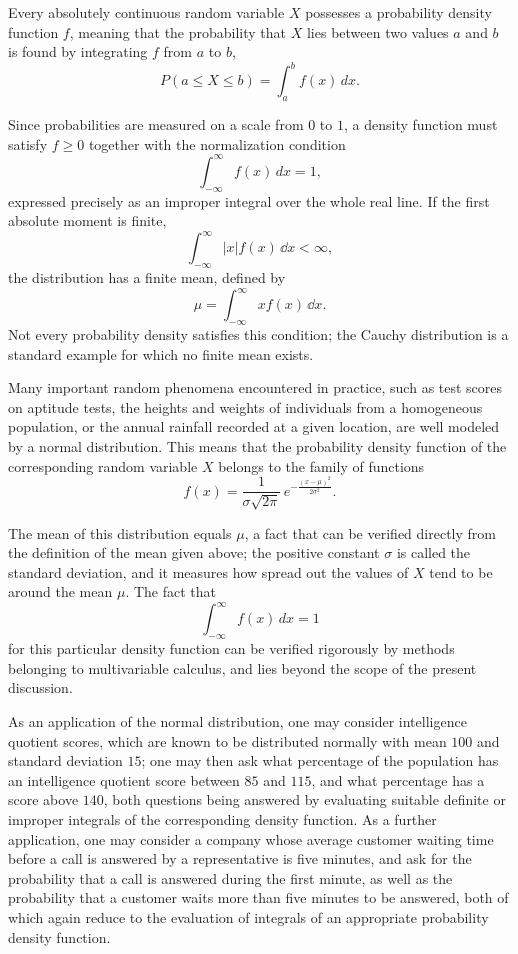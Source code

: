 Every absolutely continuous random variable $X$ possesses a probability density function $f$, meaning that the probability that $X$ lies between two values $a$ and $b$ is found by integrating $f$ from $a$ to $b$,
\[
P(a \leq X \leq b) = \int_a^b f(x) \, dx.
\]

Since probabilities are measured on a scale from $0$ to $1$, a density function must satisfy $f \geq 0$ together with the normalization condition
\[
\int_{-\infty}^{\infty} f(x) \, dx = 1,
\]
expressed precisely as an improper integral over the whole real line. If
the first absolute moment is finite,
\[
\int_{-\infty}^{\infty}|x|f(x)\,\dd x<\infty,
\]
the distribution has a finite mean, defined by
\[
\mu = \int_{-\infty}^{\infty} x f(x) \,\dd x.
\]
Not every probability density satisfies this condition; the Cauchy
distribution is a standard example for which no finite mean exists.


Many important random phenomena encountered in practice, such as test scores on aptitude tests, the heights and weights of individuals from a homogeneous population, or the annual rainfall recorded at a given location, are well modeled by a normal distribution. This means that the probability density function of the corresponding random variable $X$ belongs to the family of functions
\[
f(x) = \frac{1}{\sigma \sqrt{2\pi}} \, e^{-\frac{(x-\mu)^2}{2\sigma^2}}.
\]

The mean of this distribution equals $\mu$, a fact that can be verified directly from the definition of the mean given above; the positive constant $\sigma$ is called the standard deviation, and it measures how spread out the values of $X$ tend to be around the mean $\mu$. The fact that
\[
\int_{-\infty}^{\infty} f(x) \, dx = 1
\]
for this particular density function can be verified rigorously by methods belonging to multivariable calculus, and lies beyond the scope of the present discussion.

As an application of the normal distribution, one may consider intelligence quotient scores, which are known to be distributed normally with mean $100$ and standard deviation $15$; one may then ask what percentage of the population has an intelligence quotient score between $85$ and $115$, and what percentage has a score above $140$, both questions being answered by evaluating suitable definite or improper integrals of the corresponding density function. As a further application, one may consider a company whose average customer waiting time before a call is answered by a representative is five minutes, and ask for the probability that a call is answered during the first minute, as well as the probability that a customer waits more than five minutes to be answered, both of which again reduce to the evaluation of integrals of an appropriate probability density function.
